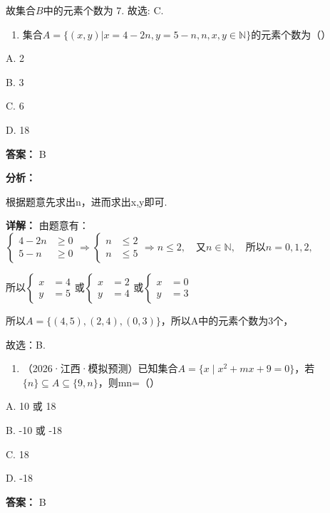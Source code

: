 \documentclass[11pt,a4paper]{ctexart}
\begin{document}
故集合\(B\)中的元素个数为 7. 故选: C.

\begin{enumerate}[label=\arabic*., leftmargin=*, start=2]
\item 集合\(A = \{(x, y) | x = 4 - 2n, y = 5 - n, n, x, y \in \mathbb{N}\}\)的元素个数为（）
\end{enumerate}

A. 2

B. 3

C. 6

D. 18

\textbf{答案：}
B

\textbf{分析：}

根据题意先求出n，进而求出x,y即可.

\textbf{详解：}
由题意有：\(\left\{\begin{aligned}4-2n&\geq0\\ 5-n&\geq0\end{aligned}\right.\Rightarrow\left\{\begin{aligned}n&\leq2\\ n&\leq5\end{aligned}\right.\Rightarrow n\leq2,\quad\text{又}n\in \mathbb{N},\quad\text{所以}n=0,1,2,\)

所以\(\left\{\begin{aligned}x&=4\\ y&=5\end{aligned}\right.\)或\(\left\{\begin{aligned}x&=2\\ y&=4\end{aligned}\right.\)或\(\left\{\begin{aligned}x&=0\\ y&=3\end{aligned}\right.\)

所以\(A=\{(4,5),(2,4),(0,3)\}\)，所以A中的元素个数为3个，

故选：B.

\begin{enumerate}[label=\arabic*., leftmargin=*, start=3]
\item （2026·江西·模拟预测）已知集合\(A=\{x\mid x^{2}+mx+9=0\}\)，若\(\{n\}\subseteq A\subseteq\{9,n\}\)，则mn=（）
\end{enumerate}

A. 10 或 18

B. -10 或 -18

C. 18

D. -18

\textbf{答案：}
B
\end{document}
